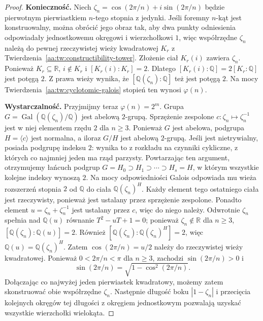 \begin{proof}
\textbf{Konieczność.}
Niech $\zeta_n=\cos(2\pi/n)+i\sin(2\pi/n)$
będzie pierwotnym pierwiastkiem $n$-tego stopnia z jedynki.
Jeśli foremny $n$-kąt jest konstruowalny, można obrócić
jego obraz tak, aby dwa punkty odniesienia odpowiadały
jednostkowemu okręgowi i wierzchołkowi $1$, więc
współrzędne $\zeta_n$ należą do pewnej rzeczywistej
wieży kwadratowej $K_r$ z
Twierdzenia~\ref{aa:tw:constructibility-tower}.
Złożenie ciał $K_r(i)$ zawiera $\zeta_n$.
Ponieważ $K_r\subseteq\mathbb R$, $i\notin K_r$
i $[K_r(i):K_r]=2$. Dlatego
$[K_r(i):\mathbb Q]=2[K_r:\mathbb Q]$ jest potęgą $2$.
Z prawa wieży wynika, że
$[\mathbb Q(\zeta_n):\mathbb Q]$ też jest potęgą $2$.
Na mocy Twierdzenia~\ref{aa:tw:cyclotomic-galois}
stopień ten wynosi $\varphi(n)$.

\textbf{Wystarczalność.}
Przyjmijmy teraz $\varphi(n)=2^m$.
Grupa $G=\operatorname{Gal}(\mathbb Q(\zeta_n)/\mathbb Q)$
jest abelową $2$-grupą. Sprzężenie zespolone
$c:\zeta_n\mapsto\zeta_n^{-1}$ jest w niej elementem
rzędu $2$ dla $n\ge3$. Ponieważ $G$ jest abelowa,
podgrupa $H=\langle c\rangle$ jest normalna,
a iloraz $G/H$ jest abelową $2$-grupą.
Jeśli jest nietrywialny, posiada podgrupę indeksu $2$:
wynika to z rozkładu na czynniki cykliczne,
z których co najmniej jeden ma rząd parzysty.
Powtarzając ten argument, otrzymujemy łańcuch podgrup
$G=H_0\supset H_1\supset\cdots\supset H_s=H$,
w którym wszystkie kolejne indeksy wynoszą $2$.
Na mocy odpowiedniości Galois odpowiada mu wieża
rozszerzeń stopnia $2$ od $\mathbb Q$ do ciała
$\mathbb Q(\zeta_n)^H$.
Każdy element tego ostatniego ciała jest rzeczywisty,
ponieważ jest ustalany przez sprzężenie zespolone.
Ponadto element $u=\zeta_n+\zeta_n^{-1}$ jest
ustalany przez $c$, więc do niego należy.
Odwrotnie $\zeta_n$ spełnia nad $\mathbb Q(u)$
równanie $T^2-uT+1=0$; ponieważ
$\zeta_n\notin\mathbb R$ dla $n\ge3$,
$[\mathbb Q(\zeta_n):\mathbb Q(u)]=2$.
Również $[\mathbb Q(\zeta_n):\mathbb Q(\zeta_n)^H]=2$,
więc $\mathbb Q(u)=\mathbb Q(\zeta_n)^H$.
Zatem $\cos(2\pi/n)=u/2$ należy do rzeczywistej
wieży kwadratowej. Ponieważ
$0<2\pi/n<\pi$ dla $n\ge3$, zachodzi
$\sin(2\pi/n)>0$ i
\[
 \sin(2\pi/n)=\sqrt{1-\cos^2(2\pi/n)}.
\]
Dołączając co najwyżej jeden pierwiastek kwadratowy,
możemy zatem skonstruować obie współrzędne $\zeta_n$.
Następnie długość boku $|1-\zeta_n|$ i przecięcia
kolejnych okręgów tej długości z okręgiem jednostkowym
pozwalają uzyskać wszystkie wierzchołki wielokąta.


\end{proof}
